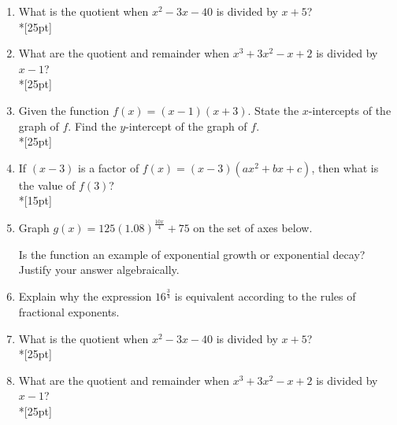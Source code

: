 \documentclass[12pt, oneside]{article}
\begin{document}
\begin{enumerate}
\item What is the quotient when $x^2-3x-40$ is divided by $x + 5$?\\*[25pt]

\item What are the quotient and remainder when $x^3+3x^2-x+2$ is divided by $x - 1$?\\*[25pt]

\item Given the function $f(x)=(x-1)(x+3)$. State the $x$-intercepts of the graph of $f$. Find the $y$-intercept of the graph of $f$.\\*[25pt]


\item If $(x-3)$ is a factor of $f(x)=(x-3)(ax^2+bx+c)$, then what is the value of $f(3)$?\\*[15pt]
\newpage

\item Graph $\displaystyle g(x)= 125(1.08)^ {\frac{10x}{4}} + 75$ on the set of axes below.
\begin{center}
\end{center} %
Is the function an example of exponential growth or exponential decay? Justify your answer algebraically.

\item Explain why the expression $\displaystyle 16^{\frac{3}{4}}$ is equivalent  according to the rules of fractional exponents. 


\newpage
\item What is the quotient when $x^2-3x-40$ is divided by $x + 5$?\\*[25pt]

\item What are the quotient and remainder when $x^3+3x^2-x+2$ is divided by $x - 1$?\\*[25pt]


\end{enumerate}
\end{document}
